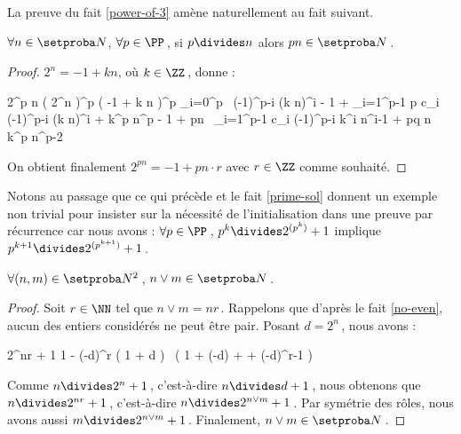 La preuve du fait \ref{power-of-3} amène naturellement au fait suivant.

\begin{fact} \label{prime-divisor}
	$\forall n \in \ourset$, $\forall p \in \PP$\,,
	si $p \divides n$ alors $p n \in \ourset$\,.
\end{fact}

\begin{proof}
	$2^n = -1 + k n$, où $k \in \ZZ$\,, donne :

    \medskip
    
    \begin{stepcalc}[style=sar]
    	2^{p n}
    \explnext{}
    	\big( 2^n \big)^p
    \explnext{}
    	\big( -1 + k n \big)^p
    \explnext{}
    	\dsum_{i=0}^p  \, (-1)^{p-i} \cdot (k n)^i
    	- 1 + \dsum_{i=1}^{p-1} p c_i \cdot (-1)^{p-i} \cdot (k n)^i + k^p \cdot n^p
    	- 1 + pn \, \dsum_{i=1}^{p-1} c_i \cdot (-1)^{p-i} \cdot k^i n^{i-1} + pq \cdot n \cdot k^p \cdot n^{p-2}
    \end{stepcalc}

    \medskip

    On obtient finalement $2^{p n} = - 1 + pn \cdot r$ avec $r \in \ZZ$ comme souhaité.
\end{proof}




Notons au passage que ce qui précède et le fait \ref{prime-sol} donnent un exemple non trivial pour insister sur la nécessité de l'initialisation dans une preuve par récurrence car nous avons :
$\forall p \in \PP$\,, $p^k \divides 2^{( p^k )} + 1$ 
implique
$p^{k+1} \divides 2^{( p^{k+1} )} + 1$\,.




\begin{fact} \label{lcm}
	$\forall (n , m) \in \ourset^2$\,, $n \vee m \in \ourset$\,.
\end{fact}

\begin{proof}
	Soit $r \in \NN$ tel que $n \vee m = n r$\,. Rappelons que d'après le fait \ref{no-even}, aucun des entiers considérés ne peut être pair.
	Posant $d = 2^n$\,, nous avons :
	
	\medskip
	
	\begin{stepcalc}[style = ar*]
		2^{nr} + 1
		1 - (-d)^r
	\explnext{}
		\big( 1 + d \big) \, \big( 1 + (-d) + \cdots + (-d)^{r-1} \big)
	\end{stepcalc}
	
	\medskip
	
	Comme $n \divides 2^n + 1$\,, c'est-à-dire $n \divides d + 1$\,, nous obtenons que $n \divides 2^{nr} + 1$\,, c'est-à-dire $n \divides 2^{n \vee m} + 1$\,.
	Par symétrie des rôles, nous avons aussi $m \divides 2^{n \vee m} + 1$\,.
	Finalement, $n \vee m \in \ourset$\,.
\end{proof}


